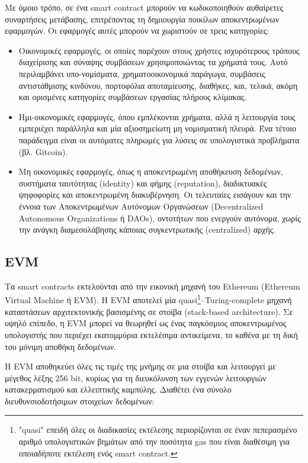 Με όμοιο τρόπο, σε ένα smart contract μπορούν να κωδικοποιηθούν αυθαίρετες συναρτήσεις μετάβασης, επιτρέποντας τη δημιουργία ποικίλων αποκεντρωμένων εφαρμογών. Οι εφαρμογές αυτές μπορούν να χωριστούν σε τρεις κατηγορίες:
\begin{itemize}
	\item Οικονομικές εφαρμογές, οι οποίες παρέχουν στους χρήστες ισχυρότερους τρόπους διαχείρισης και σύναψης συμβάσεων χρησιμοποιώντας τα χρήματά τους. Αυτό περιλαμβάνει υπο-νομίσματα, χρηματοοικονομικά παράγωγα, συμβάσεις αντιστάθμισης κινδύνου, πορτοφόλια αποταμίευσης, διαθήκες, και, τελικά, ακόμη και ορισμένες κατηγορίες συμβάσεων εργασίας πλήρους κλίμακας.
	
	\item Ημι-οικονομικές εφαρμογές, όπου εμπλέκονται χρήματα, αλλά η λειτουργία τους εμπεριέχει παράλληλα και  μία αξιοσημείωτη μη νομισματική πλευρά. Ένα τέτοιο παράδειγμα είναι οι αυτόματες πληρωμές για λύσεις σε υπολογιστικά προβλήματα (βλ. Gitcoin).
	
	\item Μη οικονομικές εφαρμογές, όπως η αποκεντρωμένη αποθήκευση δεδομένων, συστήματα ταυτότητας (identity) και φήμης (reputation), διαδικτυακές ψηφοφορίες και αποκεντρωμένη διακυβέρνηση. Οι τελευταίες εισάγουν και την έννοια των Αποκεντρωμένων Αυτόνομων Οργανώσεων (Decentralized Autonomous Organizations ή DAOs), οντοτήτων που ενεργούν αυτόνομα, χωρίς την ανάγκη διαμεσολάβησης κάποιας συγκεντρωτικής (\textenglish{centralized}) αρχής.\cite{2.6-ethereum-whitepaper}
\end{itemize}

\subsection{EVM}
Τα smart contracts εκτελούνται από την εικονική μηχανή του Ethereum (Ethereum Virtual Machine ή EVM). Η EVM αποτελεί μία quasi\footnote{"quasi" επειδή όλες οι διαδικασίες εκτέλεσης περιορίζονται σε έναν πεπερασμένο αριθμό υπολογιστικών βημάτων από την ποσότητα gas που είναι διαθέσιμη για οποιαδήποτε εκτέλεση ενός smart contract.}–Turing-complete μηχανή καταστάσεων αρχιτεκτονικής βασισμένης σε στοίβα (stack-based architecture). Σε υψηλό επίπεδο, η EVM μπορεί να θεωρηθεί ως ένας παγκόσμιος αποκεντρωμένος υπολογιστής που περιέχει εκατομμύρια εκτελέσιμα αντικείμενα, το καθένα με τη δική του μόνιμη αποθήκη δεδομένων.

Η EVM αποθηκεύει όλες τις τιμές της μνήμης σε μια στοίβα και λειτουργεί με μέγεθος λέξης 256 bit, κυρίως για τη διευκόλυνση των εγγενών λειτουργιών κατακερματισμού και ελλειπτικής καμπύλης. Διαθέτει ένα σύνολο διευθυνσιοδοτήσιμων στοιχείων δεδομένων:

